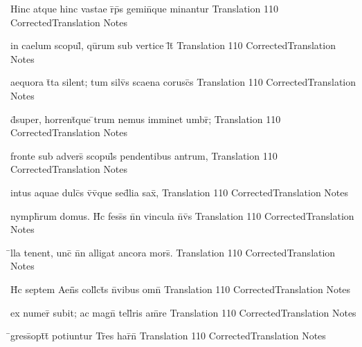 \documentclass[]{book}
\begin{document}
\latline
  {Hinc atque hinc vastae r\={}p\={}s gemin\={\macron {\i}}que minantur}
  { Translation }
  {110}
  { CorrectedTranslation }
  { Notes }



\latline
  {in caelum scopul\={\macron {\i}}, qu\={}rum sub vertice l\={}t\={}}
  { Translation }
  {110}
  { CorrectedTranslation }
  { Notes }


\latline
  {aequora t\={}ta silent; tum silv\={\macron {\i}}s scaena corusc\={\macron {\i}}s}
  { Translation }
  {110}
  { CorrectedTranslation }
  { Notes }


\latline
  {d\={}super, horrent\={\macron {\i}}que \={}trum nemus imminet umbr\={};}
  { Translation }
  {110}
  { CorrectedTranslation }
  { Notes }



\latline
  {fronte sub advers\={} scopul\={\macron {\i}}s pendentibus antrum,}
  { Translation }
  {110}
  { CorrectedTranslation }
  { Notes }


\latline
  {intus aquae dulc\={}s v\={\macron {\i}}v\={}que sed\={\macron {\i}}lia sax\={},}
  { Translation }
  {110}
  { CorrectedTranslation }
  { Notes }


\latline
  {nymph\={}rum domus.  H\={\macron {\i}}c fess\={}s n\={}n vincula n\={}v\={\macron {\i}}s}
  { Translation }
  {110}
  { CorrectedTranslation }
  { Notes }



\latline
  {\={}lla tenent, unc\={} n\={}n alligat ancora mors\={}.}
  { Translation }
  {110}
  { CorrectedTranslation }
  { Notes }


\latline
  {H\={}c septem Aen\={}\={}s coll\={}ct\={\macron {\i}}s n\={}vibus omn\={\macron {\i}}}
  { Translation }
  {110}
  { CorrectedTranslation }
  { Notes }


\latline
  {ex numer\={} subit; ac magn\={} tell\={}ris am\={}re}
  { Translation }
  {110}
  { CorrectedTranslation }
  { Notes }



\latline
  {\={}gress\={\macron {\i}}opt\={}t\={} potiuntur Tr\={}es har\={}n\={}}
  { Translation }
  {110}
  { CorrectedTranslation }
  { Notes }
\end{document}
